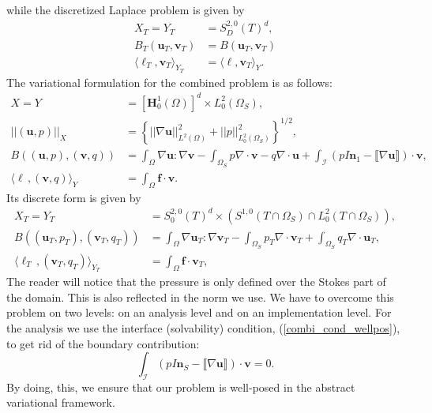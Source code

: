\documentclass[12pt,a4paper]{article}
\theoremstyle{definition}
\begin{document}
while the discretized Laplace problem is given by 
\begin{equation}\label{frame_laplace_disc}
\begin{aligned}
X_T=Y_T&=S^{2,0}_D\left(T\right)^d,\\
B_T\left(\textbf{u}_T,\textbf{v}_T\right)&=B\left(\textbf{u}_T,\textbf{v}_T\right)\\
\langle \ell_T,\textbf{v}_T \rangle_{Y_T} &=\langle \ell,\textbf{v}_T \rangle_{Y}.
\end{aligned}
\end{equation}
The variational formulation for the combined problem is as follows:
\begin{equation}\label{frame_combined}
\begin{aligned}
X=Y&=\left[\textbf{H}^1_0\left(\Omega\right)\right]^d\times L^2_0\left(\Omega_S\right),\\
\left|\left|\left(\textbf{u},p\right)\right|\right|_X&=\left\lbrace \left|\left|\nabla\textbf{u}\right|\right|^2_{L^2\left(\Omega\right)} + \left|\left|p\right|\right|^2_{L^2_0\left(\Omega_S\right)}\right\rbrace^{1/2},\\
B\left(\left(\textbf{u},p\right),\left(\textbf{v},q\right)\right)&=\int_{\Omega}\nabla \textbf{u} : \nabla \textbf{v} - \int_{\Omega_S} p \nabla\cdot\textbf{v} -q \nabla\cdot\textbf{u}   +\int_{\mathcal{I}} \left(pI \textbf{n}_1-\llbracket\nabla\textbf{u}\rrbracket\right)\cdot\textbf{v},\\
\langle \ell\,,\left(\textbf{v},q\right) \rangle_Y &= \int_{\Omega}\textbf{f}\cdot \textbf{v}.
\end{aligned}
\end{equation}
Its discrete form is given by
\begin{equation}\label{frame_combi_disc}
\begin{aligned}
X_T=Y_T&=S_0^{2,0}\left(T\right)^d\times \left(S^{1,0}\left(T\cap\Omega_S\right)\cap L^2_0\left(T\cap\Omega_S\right)\right),\\
B\left(\left(\textbf{u}_T,p_T\right),\left(\textbf{v}_T,q_T\right)\right)&=\int_{\Omega}\nabla \textbf{u}_T : \nabla \textbf{v}_T - \int_{\Omega_S} p_T \nabla\cdot\textbf{v}_T + \int_{\Omega_S} q_T \nabla\cdot\textbf{u}_T,\\
\langle \ell_T\,,\left(\textbf{v}_T,q_T\right) \rangle_{Y_T} &= \int_{\Omega}\textbf{f}\cdot \textbf{v}_T,
\end{aligned}
\end{equation}
 The reader will notice that the pressure is only defined over the Stokes part of the domain. This is also reflected in the norm we use.  
 We have to overcome this problem on two levels:  on an analysis level  and on an implementation level.  For  the analysis we use the interface (solvability) condition, (\ref{combi_cond_wellpos}), to get rid of the boundary contribution:
 \begin{equation}\label{interface_condition}
\int_{\mathcal{I}} \left(pI \textbf{n}_S-\llbracket\nabla\textbf{u}\rrbracket\right)\cdot\textbf{v}= 0.
 \end{equation}
 By doing, this, we ensure that our problem is well-posed in the abstract variational framework.  
 
\end{document}

